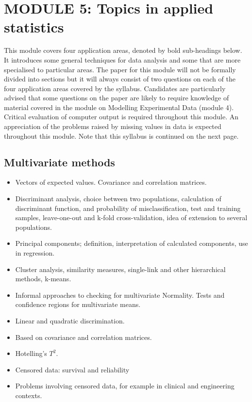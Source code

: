 \section*{MODULE 5: Topics in applied statistics}
This module covers four application areas, denoted by bold sub-headings below. It introduces some general techniques for data analysis and some that are more specialised to particular areas. The paper for this module will not be formally divided into sections but it will always consist of two questions on each of the four application areas covered by the syllabus. Candidates are particularly advised that some questions on the paper are likely to require knowledge of material covered in the module on Modelling Experimental Data (module 4).
Critical evaluation of computer output is required throughout this module. An appreciation of the problems raised by missing values in data is expected throughout this module.
Note that this syllabus is continued on the next page.
\subsection*{Multivariate methods}

\begin{itemize}
\item	Vectors of expected values. Covariance and correlation matrices.
\item	Discriminant analysis, choice between two populations, calculation of discriminant function, and probability of misclassification, test and training samples, leave-one-out and k-fold cross-validation, idea of extension to several populations.
\item	Principal components; definition, interpretation of calculated components, use in regression.
\item	Cluster analysis, similarity measures, single-link and other hierarchical methods, k-means.
\item	Informal approaches to checking for multivariate Normality. Tests and confidence regions for multivariate means.
\item	Linear and quadratic discrimination.
\item	Based on covariance and correlation matrices.
\item	Hotelling's $T^2$.
\item	Censored data: survival and reliability
\item	Problems involving censored data, for example in clinical and engineering contexts.
\end{itemize}

